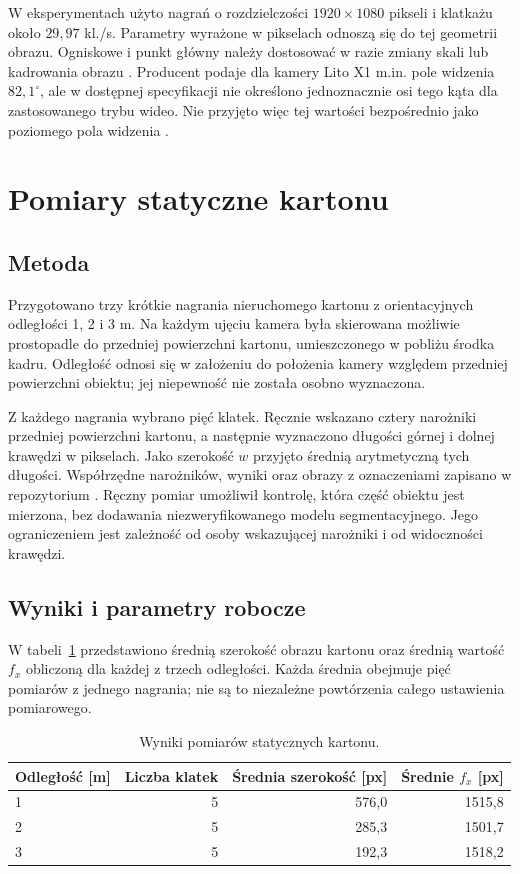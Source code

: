 \documentclass[12pt,a4paper]{article}
\begin{document}
W eksperymentach użyto nagrań o rozdzielczości $1920\times1080$ pikseli i klatkażu około $29{,}97$ kl./s. Parametry wyrażone w pikselach odnoszą się do tej geometrii obrazu. Ogniskowe i punkt główny należy dostosować w razie zmiany skali lub kadrowania obrazu \cite{opencv}. Producent podaje dla kamery Lito X1 m.in. pole widzenia $82{,}1^\circ$, ale w dostępnej specyfikacji nie określono jednoznacznie osi tego kąta dla zastosowanego trybu wideo. Nie przyjęto więc tej wartości bezpośrednio jako poziomego pola widzenia \cite{dji}.

\section{Pomiary statyczne kartonu}

\subsection{Metoda}

Przygotowano trzy krótkie nagrania nieruchomego kartonu z orientacyjnych odległości 1, 2 i 3 m. Na każdym ujęciu kamera była skierowana możliwie prostopadle do przedniej powierzchni kartonu, umieszczonego w pobliżu środka kadru. Odległość odnosi się w założeniu do położenia kamery względem przedniej powierzchni obiektu; jej niepewność nie została osobno wyznaczona.

Z każdego nagrania wybrano pięć klatek. Ręcznie wskazano cztery narożniki przedniej powierzchni kartonu, a następnie wyznaczono długości górnej i dolnej krawędzi w pikselach. Jako szerokość $w$ przyjęto średnią arytmetyczną tych długości. Współrzędne narożników, wyniki oraz obrazy z oznaczeniami zapisano w repozytorium \cite{pomiary}. Ręczny pomiar umożliwił kontrolę, która część obiektu jest mierzona, bez dodawania niezweryfikowanego modelu segmentacyjnego. Jego ograniczeniem jest zależność od osoby wskazującej narożniki i od widoczności krawędzi.

\subsection{Wyniki i parametry robocze}

W tabeli~\ref{tab:static} przedstawiono średnią szerokość obrazu kartonu oraz średnią wartość $f_x$ obliczoną dla każdej z trzech odległości. Każda średnia obejmuje pięć pomiarów z jednego nagrania; nie są to niezależne powtórzenia całego ustawienia pomiarowego.
\begin{table}[htbp]
\centering
\caption{Wyniki pomiarów statycznych kartonu.}
\label{tab:static}
\begin{tabular}{lrrr}
\toprule
Odległość [m] & Liczba klatek & Średnia szerokość [px] & Średnie $f_x$ [px] \\
\midrule
1 & 5 & 576,0 & 1515,8 \\
2 & 5 & 285,3 & 1501,7 \\
3 & 5 & 192,3 & 1518,2 \\
\bottomrule
\end{tabular}
\end{table}
\end{document}
